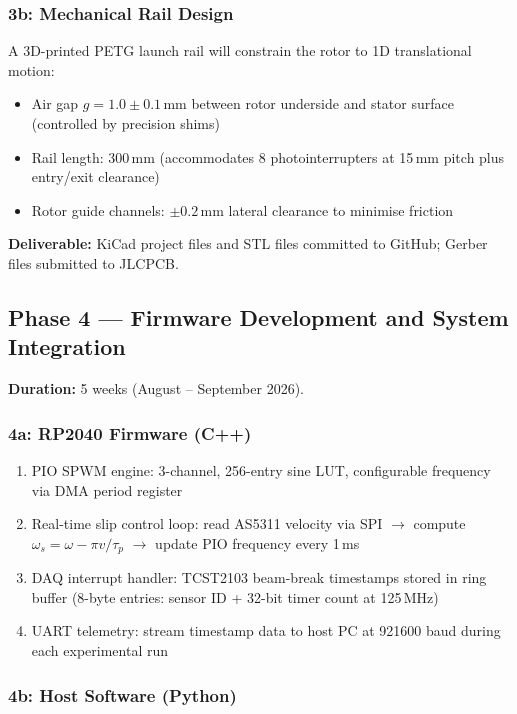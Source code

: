 \documentclass[12pt,letterpaper]{article}
\begin{document}
\subsubsection{3b: Mechanical Rail Design}

A 3D-printed PETG launch rail will constrain the rotor to 1D translational motion:
\begin{itemize}[noitemsep]
  \item Air gap $g = 1.0 \pm 0.1$\,mm between rotor underside and stator surface
    (controlled by precision shims)
  \item Rail length: 300\,mm (accommodates 8 photointerrupters at 15\,mm pitch
    plus entry/exit clearance)
  \item Rotor guide channels: $\pm 0.2$\,mm lateral clearance to minimise friction
\end{itemize}

\textbf{Deliverable:} KiCad project files and STL files committed to GitHub;
Gerber files submitted to JLCPCB.

\subsection{Phase 4 — Firmware Development and System Integration}

\textbf{Duration:} 5 weeks (August -- September 2026).

\subsubsection{4a: RP2040 Firmware (C++)}

\begin{enumerate}[noitemsep, label=\arabic*.]
  \item PIO SPWM engine: 3-channel, 256-entry sine LUT, configurable frequency
    via DMA period register
  \item Real-time slip control loop: read AS5311 velocity via SPI $\to$ compute
    $\omega_s = \omega - \pi v/\tau_p$ $\to$ update PIO frequency every 1\,ms
  \item DAQ interrupt handler: TCST2103 beam-break timestamps stored in ring buffer
    (8-byte entries: sensor ID + 32-bit timer count at 125\,MHz)
  \item UART telemetry: stream timestamp data to host PC at 921600 baud during
    each experimental run
\end{enumerate}

\subsubsection{4b: Host Software (Python)}
\end{document}
